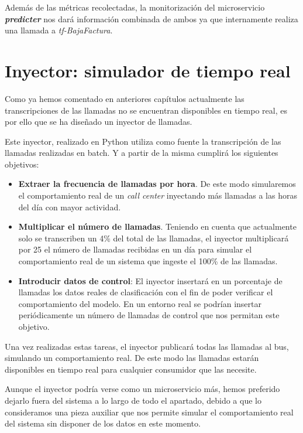 Además de las métricas recolectadas, la monitorización del microservicio \textit{\textbf{predicter}} nos dará información combinada de ambos ya que internamente realiza una llamada a \textit{tf-BajaFactura}.



\section{Inyector: simulador de tiempo real}
Como ya hemos comentado en anteriores capítulos actualmente las transcripciones de las llamadas no se encuentran disponibles en tiempo real, es por ello que se ha diseñado un inyector de llamadas.

Este inyector, realizado en Python utiliza como fuente la transcripción de las llamadas realizadas en batch. Y a partir de la misma cumplirá los siguientes objetivos: 

\begin{itemize}
	\item \textbf{ Extraer la frecuencia de llamadas por hora}. De este modo simularemos el comportamiento real de un \textit{call center} inyectando más llamadas a las horas del día con mayor actividad.
	\item \textbf{Multiplicar el número de llamadas}. Teniendo en cuenta que actualmente solo se transcriben un 4\% del total de las llamadas, el inyector multiplicará por 25 el número de llamadas recibidas en un día para simular el comportamiento real de un sistema que ingeste el 100\% de las llamadas.
	\item \textbf{Introducir datos de control}: El inyector insertará en un porcentaje de llamadas los datos reales de clasificación con el fin de poder verificar el comportamiento del modelo. En un entorno real se podrían insertar periódicamente un número de llamadas de control que nos permitan este objetivo.
	
\end{itemize}

Una vez realizadas estas tareas, el inyector publicará todas las llamadas al bus, simulando un comportamiento real. De este modo las llamadas estarán disponibles en tiempo real para cualquier consumidor que las necesite.

Aunque el inyector podría verse como un microservicio más, hemos preferido dejarlo fuera del sistema a lo largo de todo el apartado, debido a que lo consideramos una pieza auxiliar que nos permite simular el comportamiento real del sistema sin disponer de los datos en este momento.

